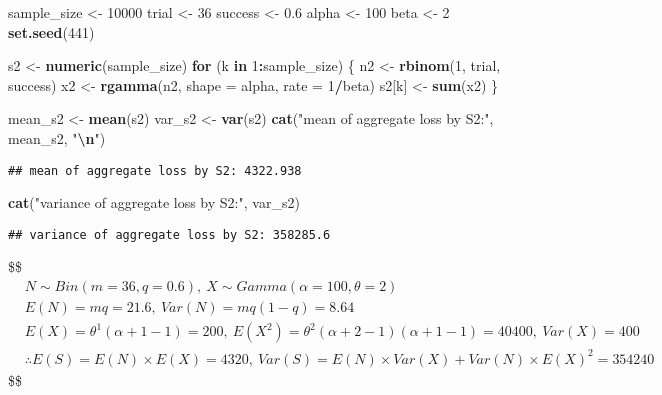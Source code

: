 \documentclass[
]{article}
\newenvironment{Shaded}{\begin{snugshade}}{\end{snugshade}}
\newcommand{\AttributeTok}[1]{\textcolor[rgb]{0.13,0.29,0.53}{#1}}
\newcommand{\ControlFlowTok}[1]{\textcolor[rgb]{0.13,0.29,0.53}{\textbf{#1}}}
\newcommand{\DecValTok}[1]{\textcolor[rgb]{0.00,0.00,0.81}{#1}}
\newcommand{\FloatTok}[1]{\textcolor[rgb]{0.00,0.00,0.81}{#1}}
\newcommand{\FunctionTok}[1]{\textcolor[rgb]{0.13,0.29,0.53}{\textbf{#1}}}
\newcommand{\NormalTok}[1]{#1}
\newcommand{\OtherTok}[1]{\textcolor[rgb]{0.56,0.35,0.01}{#1}}
\newcommand{\SpecialCharTok}[1]{\textcolor[rgb]{0.81,0.36,0.00}{\textbf{#1}}}
\newcommand{\StringTok}[1]{\textcolor[rgb]{0.31,0.60,0.02}{#1}}
\begin{document}
\begin{Shaded}
\begin{Highlighting}[]
\NormalTok{sample\_size }\OtherTok{\textless{}{-}} \DecValTok{10000}
\NormalTok{trial }\OtherTok{\textless{}{-}} \DecValTok{36}
\NormalTok{success }\OtherTok{\textless{}{-}} \FloatTok{0.6}
\NormalTok{alpha }\OtherTok{\textless{}{-}} \DecValTok{100}
\NormalTok{beta }\OtherTok{\textless{}{-}} \DecValTok{2}
\FunctionTok{set.seed}\NormalTok{(}\DecValTok{441}\NormalTok{)}

\NormalTok{s2 }\OtherTok{\textless{}{-}} \FunctionTok{numeric}\NormalTok{(sample\_size)}
\ControlFlowTok{for}\NormalTok{ (k }\ControlFlowTok{in} \DecValTok{1}\SpecialCharTok{:}\NormalTok{sample\_size) \{}
\NormalTok{  n2 }\OtherTok{\textless{}{-}} \FunctionTok{rbinom}\NormalTok{(}\DecValTok{1}\NormalTok{, trial, success)}
\NormalTok{  x2 }\OtherTok{\textless{}{-}} \FunctionTok{rgamma}\NormalTok{(n2, }\AttributeTok{shape =}\NormalTok{ alpha, }\AttributeTok{rate =} \DecValTok{1}\SpecialCharTok{/}\NormalTok{beta)}
\NormalTok{  s2[k] }\OtherTok{\textless{}{-}} \FunctionTok{sum}\NormalTok{(x2)}
\NormalTok{\}}

\NormalTok{mean\_s2 }\OtherTok{\textless{}{-}} \FunctionTok{mean}\NormalTok{(s2)}
\NormalTok{var\_s2 }\OtherTok{\textless{}{-}} \FunctionTok{var}\NormalTok{(s2)}
\FunctionTok{cat}\NormalTok{(}\StringTok{"mean of aggregate loss by S2:"}\NormalTok{, mean\_s2, }\StringTok{"}\SpecialCharTok{\textbackslash{}n}\StringTok{"}\NormalTok{)}
\end{Highlighting}
\end{Shaded}

\begin{verbatim}
## mean of aggregate loss by S2: 4322.938
\end{verbatim}

\begin{Shaded}
\begin{Highlighting}[]
\FunctionTok{cat}\NormalTok{(}\StringTok{"variance of aggregate loss by S2:"}\NormalTok{, var\_s2)}
\end{Highlighting}
\end{Shaded}

\begin{verbatim}
## variance of aggregate loss by S2: 358285.6
\end{verbatim}

\$\$ \begin{align*}

& N \sim Bin(m = 36, q = 0.6), \: X \sim Gamma(\alpha = 100, \theta = 2)
\\
& E(N) = mq = 21.6, \: Var(N) = mq(1-q) = 8.64
\\
& E(X) = \theta^{1}(\alpha + 1 - 1) = 200, \: E(X^{2}) = \theta^{2}(\alpha + 2 - 1)(\alpha + 1 -1) = 40400, \: Var(X) = 400
\\
& \therefore E(S) = E(N) \times E(X) = 4320, \: Var(S) = E(N) \times Var(X) + Var(N) \times E(X)^{2} = 354240

\end{align*} \$\$
\end{document}
